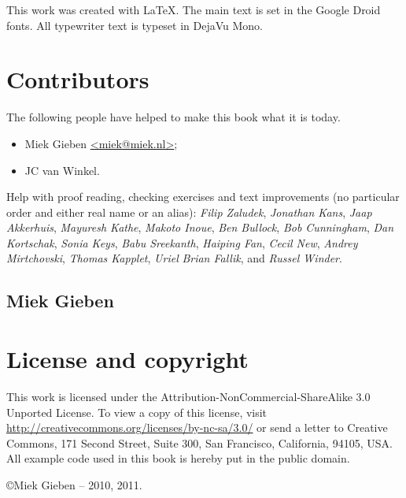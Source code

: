 \noindent{}This work was created with \LaTeX. The main text is set in
the Google Droid fonts. All typewriter text is typeset in DejaVu Mono.

\section{Contributors}
The following people have helped to make this book what it is today.
\begin{itemize}
\item{Miek Gieben \qquad\url{<miek@miek.nl>}};
\item{JC van Winkel}.
\end{itemize}

Help with proof reading, checking exercises and text improvements (no
particular order and either real name or an alias):
\emph{Filip Zaludek},
\emph{Jonathan Kans},
\emph{Jaap Akkerhuis},
\emph{Mayuresh Kathe},
\emph{Makoto Inoue},
\emph{Ben Bullock},
\emph{Bob Cunningham},
\emph{Dan Kortschak},
\emph{Sonia Keys},
\emph{Babu Sreekanth},
\emph{Haiping Fan},
\emph{Cecil New},
\emph{Andrey Mirtchovski},
\emph{Thomas Kapplet},
\emph{Uriel}
\emph{Brian Fallik},
and \emph{Russel Winder}.

\subsection{Miek Gieben}


\section{License and copyright}
This work is licensed under the Attribution-NonCommercial-ShareAlike 3.0 Unported License. To
view a copy of this license, visit \url{http://creativecommons.org/licenses/by-nc-sa/3.0/}
or send a letter to Creative Commons, 171 Second Street, Suite 300, San
Francisco, California, 94105, USA.\newline
All example code used in this book is hereby put in the public domain.

\copyright Miek Gieben -- 2010, 2011.

